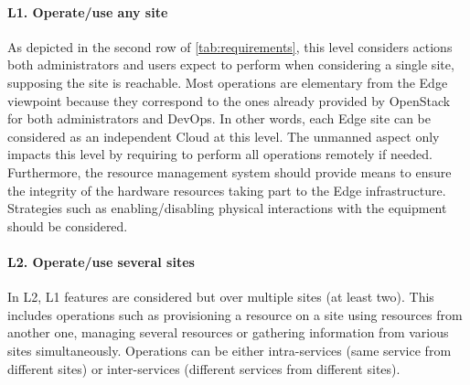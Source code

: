 \paragraph{L1. Operate/use any site}
As depicted in the second row of \cref{tab:requirements}, this level
considers actions both administrators and users expect to perform
when considering a single site, supposing the site is reachable.
%
Most operations are elementary from the Edge viewpoint because they correspond
to the ones already provided by OpenStack for both administrators and DevOps.
In other words, each Edge site can be considered as an independent Cloud at
this level. The unmanned aspect only impacts this level by requiring to perform
all operations remotely if needed.
Furthermore, the resource management system should provide means to
ensure the integrity of the hardware resources taking part to the Edge
infrastructure. Strategies such as enabling/disabling physical
interactions with the equipment should be considered.




\paragraph{L2. Operate/use several sites}

In L2, L1 features are considered but over multiple sites (at least two). This
includes operations such as provisioning a resource on a site using resources
from another one, managing several resources or gathering information from
various sites simultaneously.
Operations can be either intra-services (same service from different sites) or
inter-services (different services from different sites).

